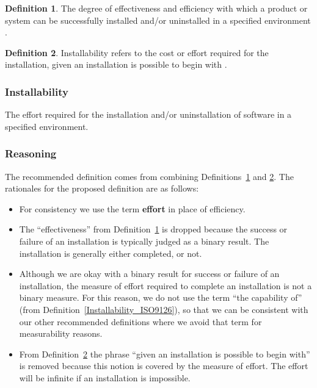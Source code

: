 \documentclass[letterpaper, cleveref]{lipics-v2019}
\theoremstyle{definition}
\newtheorem{defn}{Definition}
\begin{document}
\begin{defn} \label{Installability_Selected2}
	The degree of effectiveness and efficiency with which a product or system can
	be successfully installed and/or uninstalled in a specified environment
	\citep{ISO/IEC25010}. %
\end{defn}

\begin{defn} \label{Installability_Selected1} Installability refers to the cost
  or effort required for the installation, given an installation is possible to
  begin with \citep{lenhard2013measuring}.
\end{defn}

\begin{mybox}
\subsubsection*{Installability} 

The effort required for the installation and/or uninstallation of software in a
specified environment.

\end{mybox}

\subsubsection*{Reasoning}

The recommended definition comes from combining
Definitions~\ref{Installability_Selected2} and \ref{Installability_Selected1}.
The rationales for the proposed definition are as follows:

\begin{itemize}
  \item For consistency we use the term \textbf{effort} in place of efficiency.
  \item The ``effectiveness'' from Definition~\ref{Installability_Selected2} is
  dropped because the success or failure of an installation is typically judged
  as a binary result.  The installation is generally either completed, or not.
  \item Although we are okay with a binary result for success or failure of an
  installation, the measure of effort required to complete an installation is
  not a binary measure.  For this reason, we do not use the term ``the
  capability of'' (from Definition~\ref{Installability_ISO9126}), so that we can
  be consistent with our other recommended definitions where we avoid that term
  for measurability reasons.
  \item From Definition~\ref{Installability_Selected1} the phrase ``given an
  installation is possible to begin with'' is removed because this notion is
  covered by the measure of effort.  The effort will be infinite if an
  installation is impossible.
\end{itemize}
\end{document}
